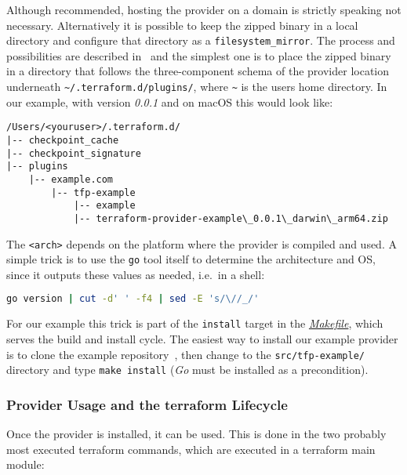 \documentclass[paper=a4,11pt,numbers=noenddot]{article}
\begin{document}
Although recommended, hosting the provider on a domain is strictly speaking not necessary. Alternatively it is possible to keep the zipped binary in a local directory and configure that directory as a \verb'filesystem_mirror'. The process and possibilities are described in~\autocite{noauthor_terraform_provider_installation_nodate} and the simplest one is to place the zipped binary in a directory that follows the three-component schema of the provider location underneath \verb'~/.terraform.d/plugins/', where \verb'~' is the users home directory. In our example, with version \emph{0.0.1} and on macOS this would look like:

\begin{lstlisting}
/Users/<youruser>/.terraform.d/
|-- checkpoint_cache
|-- checkpoint_signature
|-- plugins
    |-- example.com
        |-- tfp-example
            |-- example
            |-- terraform-provider-example\_0.0.1\_darwin\_arm64.zip
\end{lstlisting}

The \verb'<arch>' depends on the platform where the provider is compiled and used. A simple trick is to use the \verb'go' tool itself to determine the architecture and OS, since it outputs these values as needed, i.e.\ in a shell:

\begin{lstlisting}[language=bash,basicstyle=\ttfamily\footnotesize,numbers=none]
go version | cut -d' ' -f4 | sed -E 's/\//_/'
\end{lstlisting}

For our example this trick is part of the \verb'install' target in the \href{https://github.com/ecky-l/terraform-provider-example/blob/main/src/tfp-example/Makefile}{\emph{Makefile}}, which serves the build and install cycle. The easiest way to install our example provider is to clone the example repository~\autocite{ecky-l_terraform-provider-example_nodate}, then change to the \verb'src/tfp-example/' directory and type \verb'make install' (\emph{Go} must be installed as a precondition).

\subsubsection{Provider Usage and the terraform Lifecycle}
\label{subsubsec:prov-usage-terr}

Once the provider is installed, it can be used. This is done in the two probably most executed terraform commands, which are executed in a terraform main module:
\end{document}
